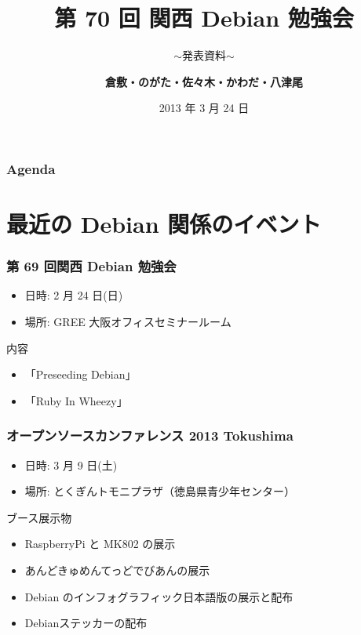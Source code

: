 \documentclass[cjk,dvipdfmx,10pt,compress,%
hyperref={bookmarks=true,bookmarksnumbered=true,bookmarksopen=false,%
colorlinks=false,%
pdftitle={第 70 回 関西 Debian 勉強会},%
pdfauthor={倉敷・のがた・佐々木・かわだ・八津尾},%
pdfsubject={資料},%
}]{beamer}
\title{第 70 回 関西 Debian 勉強会}
\subtitle{$\sim$発表資料$\sim$}
\author[かわだ てつたろう]{{\large\bf 倉敷・のがた・佐々木・かわだ・八津尾}}
\institute[Debian JP]{{\normalsize\tt 関西 Debian 勉強会}}
\date{{\small 2013 年 3 月 24 日}}
\begin{document}
\settitleslide
\begin{frame}
\titlepage
\end{frame}
\setdefaultslide

\begin{frame}[fragile]
\frametitle{Agenda}

\tableofcontents

\end{frame}

\section{最近の Debian 関係のイベント}


\begin{frame}[fragile]
  \frametitle{第 69 回関西 Debian 勉強会}
  \begin{itemize}
  \item 日時: 2 月 24 日(日)
  \item 場所: GREE 大阪オフィスセミナールーム
  \end{itemize}
  \begin{block}{内容}
    \begin{itemize}
    \item 「Preseeding Debian」
    \item 「Ruby In Wheezy」
    \end{itemize}
  \end{block}
\end{frame}

\begin{frame}[fragile]
  \frametitle{オープンソースカンファレンス 2013 Tokushima}
  \begin{itemize}
  \item 日時: 3 月 9 日(土)
  \item 場所: とくぎんトモニプラザ（徳島県青少年センター）
  \end{itemize}
  \begin{block}{ブース展示物}
    \begin{itemize}
    \item RaspberryPi と MK802 の展示
    \item あんどきゅめんてっどでびあんの展示
    \item Debian のインフォグラフィック日本語版の展示と配布
    \item Debianステッカーの配布
    \end{itemize}
  \end{block}
\end{frame}
\end{document}
